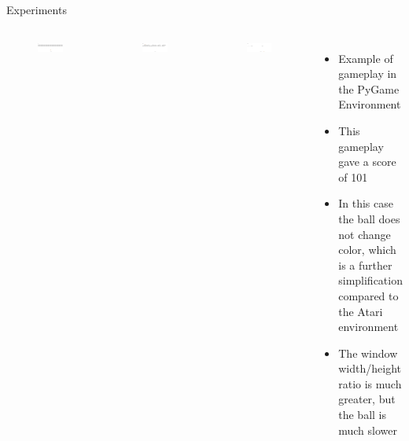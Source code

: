 \begin{frame}{Experiments}
    \begin{columns}[c,onlytextwidth]
            \begin{figure}
                \includegraphics[width=\textwidth]{images/pygame-sequence-0.png}
            \end{figure}
            \begin{figure}
                \includegraphics[width=\textwidth]{images/pygame-sequence-1.png}
            \end{figure}
            \begin{figure}
                \includegraphics[width=\textwidth]{images/pygame-sequence-2.png}
            \end{figure}
	    \begin{itemize}
		\item Example of gameplay in the PyGame Environment
		\item This gameplay gave a score of 101
		\item In this case the ball does not change color, which is a further simplification compared to the Atari environment
		\item The window width/height ratio is much greater, but the ball is much slower
	    \end{itemize}
    \end{columns}
\end{frame}

